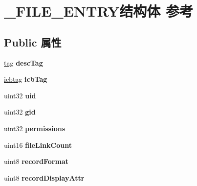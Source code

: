 \hypertarget{struct___f_i_l_e___e_n_t_r_y}{}\section{\+\_\+\+F\+I\+L\+E\+\_\+\+E\+N\+T\+R\+Y结构体 参考}
\label{struct___f_i_l_e___e_n_t_r_y}
\subsection*{Public 属性}
\begin{DoxyCompactItemize}
\item 
\mbox{\label{struct___f_i_l_e___e_n_t_r_y_a048d8798b4ff9daa7673982992f79fc9}} 
\hyperlink{structtag}{tag} {\bfseries desc\+Tag}
\item 
\mbox{\label{struct___f_i_l_e___e_n_t_r_y_adbfc6c117641bedaffc9966ddb1a462d}} 
\hyperlink{structicbtag}{icbtag} {\bfseries icb\+Tag}
\item 
\mbox{\label{struct___f_i_l_e___e_n_t_r_y_af71b95a9919c09cb75273df4fd1fba67}} 
uint32 {\bfseries uid}
\item 
\mbox{\label{struct___f_i_l_e___e_n_t_r_y_a9a70a019ae6487ff4173afdcd7bc8e78}} 
uint32 {\bfseries gid}
\item 
\mbox{\label{struct___f_i_l_e___e_n_t_r_y_a1584420e2c63fac9fa9fc72d1fd78a3b}} 
uint32 {\bfseries permissions}
\item 
\mbox{\label{struct___f_i_l_e___e_n_t_r_y_a3c832f6bdb2723f8fec42a7744be512f}} 
uint16 {\bfseries file\+Link\+Count}
\item 
\mbox{\label{struct___f_i_l_e___e_n_t_r_y_af0fd1d69af95c3909d2cc99809a6cbe6}} 
uint8 {\bfseries record\+Format}
\item 
\mbox{\label{struct___f_i_l_e___e_n_t_r_y_aa5c4ed0c0d99027bbe56c7f106cc937b}} 
uint8 {\bfseries record\+Display\+Attr}
\item 
\mbox{\label{struct___f_i_l_e___e_n_t_r_y_acced60828066ef3801ff143e0031326b}} 

\end{DoxyCompactItemize}
